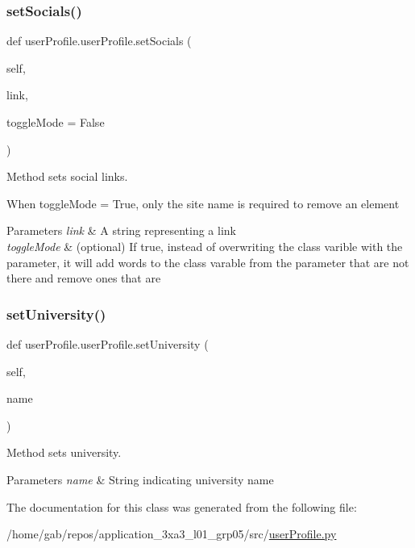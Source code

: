 \subsubsection{\texorpdfstring{set\+Socials()}{setSocials()}}
{\footnotesize\ttfamily def user\+Profile.\+user\+Profile.\+set\+Socials (\begin{DoxyParamCaption}\item[{}]{self,  }\item[{}]{link,  }\item[{}]{toggle\+Mode = {\ttfamily False} }\end{DoxyParamCaption})}



Method sets social links. 

When toggle\+Mode = True, only the site name is required to remove an element 
\begin{DoxyParams}{Parameters}
{\em link} & A string representing a link \\
\hline
{\em toggle\+Mode} & (optional) If true, instead of overwriting the class varible with the parameter, it will add words to the class varable from the parameter that are not there and remove ones that are \\
\hline
\end{DoxyParams}
\mbox{\label{classuserProfile_1_1userProfile_a33423b70af186c953dc94e302cc717d3}} 
\subsubsection{\texorpdfstring{set\+University()}{setUniversity()}}
{\footnotesize\ttfamily def user\+Profile.\+user\+Profile.\+set\+University (\begin{DoxyParamCaption}\item[{}]{self,  }\item[{}]{name }\end{DoxyParamCaption})}



Method sets university. 


\begin{DoxyParams}{Parameters}
{\em name} & String indicating university name \\
\hline
\end{DoxyParams}


The documentation for this class was generated from the following file\+:\begin{DoxyCompactItemize}
\item 
/home/gab/repos/application\+\_\+3xa3\+\_\+l01\+\_\+grp05/src/\hyperlink{userProfile_8py}{user\+Profile.\+py}\end{DoxyCompactItemize}

